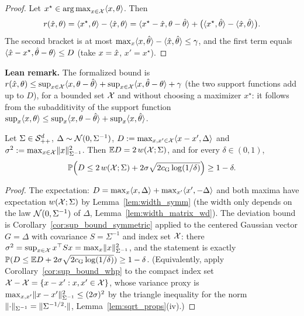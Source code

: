\begin{proof}
\leanok
{}
Let $x^\star \in \operatorname*{arg\,max}_{x\in\mathcal{X}}\langle x, \theta \rangle$. Then
\[
  r(\hat{x},\theta) = \langle x^\star, \theta \rangle - \langle \hat{x}, \theta \rangle
  = \langle x^\star - \hat{x}, \theta - \hat\theta \rangle + \big(\langle x^\star, \hat\theta \rangle - \langle \hat{x}, \hat\theta \rangle\big) .
\]
The second bracket is at most $\max_x\langle x, \hat\theta \rangle - \langle \hat{x}, \hat\theta \rangle \le \gamma$, and the
first term equals $\langle \hat{x} - x^\star, \hat\theta - \theta \rangle \le D$ (take $x = \hat{x}$, $x' = x^\star$).
\end{proof}

\textbf{Lean remark.} The formalized bound is
$r(\hat{x},\theta) \le \sup_{x\in\mathcal{X}}\langle x, \theta - \hat\theta \rangle + \sup_{x\in\mathcal{X}}\langle x, \hat\theta-\theta \rangle + \gamma$
(the two support functions add up to $D$), for a bounded set $\mathcal{X}$ and without choosing a
maximizer $x^\star$: it follows from the subadditivity of the support function
$\sup_x\langle x, \theta \rangle \le \sup_x\langle x, \theta-\hat\theta \rangle + \sup_x\langle x, \hat\theta \rangle$.

\begin{lemma}\label{lem:difference_process_concentration}
\leanok
{}
Let $\Sigma \in \mathcal{S}_{++}^{d}$, $\Delta \sim \mathcal{N}(0,\Sigma^{-1})$, $D := \max_{x,x'\in\mathcal{X}}\langle x-x', \Delta \rangle$
and $\sigma^2 := \max_{x\in\mathcal{X}}\lVert x \rVert_{\Sigma^{-1}}^2$. Then $\mathbb{E} D = 2\,w(\mathcal{X};\Sigma)$, and
for every $\delta \in (0,1)$,
\[
  \mathbb{P}\Big( D \le 2\,w(\mathcal{X};\Sigma) + 2\sigma\sqrt{2c_{\mathrm{G}}\log(1/\delta)} \Big) \ge 1 - \delta .
\]
\end{lemma}

\begin{proof}
\leanok
{}
The expectation: $D = \max_x\langle x, \Delta \rangle + \max_{x'}\langle x', -\Delta \rangle$ and both maxima have
expectation $w(\mathcal{X};\Sigma)$ by Lemma~\ref{lem:width_symm} (the width only depends on the
law $\mathcal{N}(0,\Sigma^{-1})$ of $\Delta$, Lemma~\ref{lem:width_matrix_wd}). The deviation bound is
Corollary~\ref{cor:sup_bound_symmetric} applied to the centered Gaussian vector $G = \Delta$ with
covariance $S = \Sigma^{-1}$ and index set $\mathcal{X}$: there $\sigma^2 = \sup_{x\in\mathcal{X}}x^\top Sx =
\max_x\lVert x \rVert_{\Sigma^{-1}}^2$, and the statement is exactly
$\mathbb{P}(D \le \mathbb{E} D + 2\sigma\sqrt{2c_{\mathrm{G}}\log(1/\delta)}) \ge 1-\delta$. (Equivalently, apply
Corollary~\ref{cor:sup_bound_whp} to the compact index set $\mathcal{X} - \mathcal{X} = \{x - x' : x,x'\in\mathcal{X}\}$,
whose variance proxy is $\max_{x,x'}\lVert x-x' \rVert_{\Sigma^{-1}}^2 \le (2\sigma)^2$ by the triangle
inequality for the norm $\lVert \cdot \rVert_{\Sigma^{-1}} = \lVert \Sigma^{-1/2}\cdot \rVert$,
Lemma~\ref{lem:sqrt_props}(iv).)
\end{proof}

